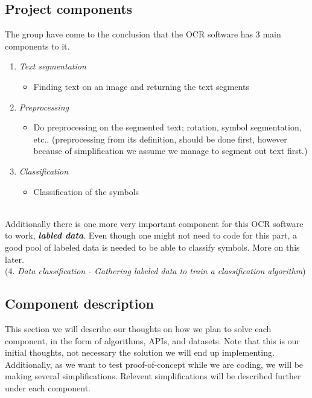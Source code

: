 \documentclass[11pt,a4paper,UKenglish]{article}
\begin{document}
\subsection{Project components}
The group have come to the conclusion that the OCR software has 3 main
components to it.
\begin{enumerate}
 \item{\textit{Text segmentation}}
 \begin{itemize}
  \item{Finding text on an image and returning the text segments}
 \end{itemize}
 \item{\textit{Preprocessing}}
 \begin{itemize}
  \item{Do preprocessing on the segmented text; rotation, symbol segmentation,
  etc.. (preprocessing from its definition, should be done first, however
  because of simplification we assume we manage to segment out text first.)}
 \end{itemize}
 \item{\textit{Classification}}
 \begin{itemize}
  \item{Classification of the symbols}
 \end{itemize}
\end{enumerate}
\noindent \\ Additionally there is one more very important component for this
OCR software to work, \textit{\textbf{labled data}}. Even though one might not
need to code for this part, a good pool of labeled data is needed to be able to
classify symbols. More on this later.
\noindent \\ (4. \textit{Data classification - Gathering labeled data to train a classification algorithm})

\subsection{Component description}
This section we will describe our thoughts on how we plan to solve each
component, in the form of algorithms, APIs, and datasets. Note that this is our
initial thoughts, not necessary the solution we will end up implementing.
Additionally, as we want to test proof-of-concept while we are coding, we will
be making several simplifications. Relevent simplifications will be described
further under each component.
\end{document}
